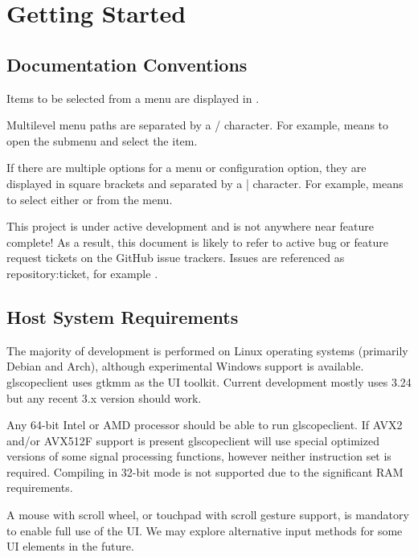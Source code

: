\chapter{Getting Started}

\section{Documentation Conventions}

Items to be selected from a menu are displayed in .

Multilevel menu paths are separated by a / character. For example,  means to open the
 submenu and select the  item.

If there are multiple options for a menu or configuration option, they are displayed in square brackets and separated
by a | character. For example,  means to select either
 or  from the 
menu.

This project is under active development and is not anywhere near feature complete! As a result, this document is
likely to refer to active bug or feature request tickets on the GitHub issue trackers. Issues are referenced as
repository:ticket, for example .

\section{Host System Requirements}

The majority of development is performed on Linux operating systems (primarily Debian and Arch), although experimental
Windows support is available. glscopeclient uses gtkmm as the UI toolkit. Current development mostly uses 3.24 but any
recent 3.x version should work.

Any 64-bit Intel or AMD processor should be able to run glscopeclient. If AVX2 and/or AVX512F support is present
glscopeclient will use special optimized versions of some signal processing functions, however neither instruction set
is required. Compiling in 32-bit mode is not supported due to the significant RAM requirements.

A mouse with scroll wheel, or touchpad with scroll gesture support, is mandatory to enable full use of the UI. We may
explore alternative input methods for some UI elements in the future.


